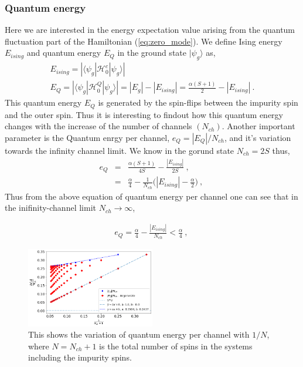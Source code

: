 \documentclass[reprint,prb,superscriptaddress]{revtex4-2}
\begin{document}
\subsubsection{Quantum energy}
\noindent Here we are interested in the energy expectation value arising from the quantum fluctuation part of the Hamiltonian (\ref{eq:zero_mode}). We define Ising energy $E_{ising}$ and quantum energy $E_{Q}$ in the ground state $|\psi_g\rangle$ as,
\begin{gather}
	E_{ising} = |\langle \psi_g | \mathcal{H}^c_0 | \psi_g \rangle| \\
E_{Q} = |\langle \psi_g | \mathcal{H}^Q_0 | \psi_g \rangle|=|E_g|-|E_{ising}| = \frac{\alpha(S+1)}{2} - |E_{ising}|~.
\end{gather}  
This quantum energy $E_Q$ is generated by the spin-flips between the impurity spin and the outer spin. Thus it is interesting to findout how this quantum energy changes with the increase of the number of channels $(N_{ch})$. Another important parameter is the Quantum enrgy per channel, $e_Q=|E_Q|/N_{ch}$, and it's variation towards the infinity channel limit. We know in the gorund state $N_{ch}=2S$ thus,
\begin{eqnarray}
e_Q &=& \frac{\alpha(S+1)}{4S} - \frac{|E_{ising}|}{2S} ~,~\nonumber\\
&=& \frac{\alpha}{4} -\frac{1}{N_{ch}} \bigg(|E_{ising}| -\frac{\alpha}{2}  \bigg)~,~
\end{eqnarray}
Thus from the above equation of quantum energy per channel one can see that in the inifinity-channel limit $N_{ch}\rightarrow \infty$, 

\begin{eqnarray}
e_Q = \frac{\alpha}{4}- \frac{|E_{ising}|}{N_{ch}} < \frac{\alpha}{4}~,~
\end{eqnarray}

\begin{figure}[!htpb]
\centering
\includegraphics[width=0.5\textwidth]{plt/Quantum_Energy_per_channel}
\caption{This shows the variation of quantum energy per channel with $1/N$, where $N=N_{ch}+1$ is the total number of spins in the systems including the impurity spins. }
\end{figure}
\end{document}

